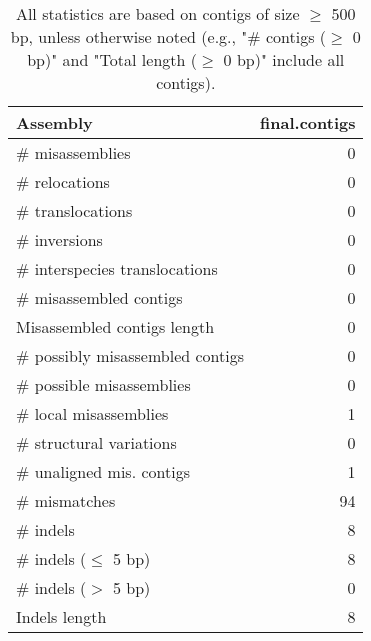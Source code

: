 \documentclass[12pt,a4paper]{article}
\begin{document}
\begin{table}[ht]
\begin{center}
\caption{All statistics are based on contigs of size $\geq$ 500 bp, unless otherwise noted (e.g., "\# contigs ($\geq$ 0 bp)" and "Total length ($\geq$ 0 bp)" include all contigs).}
\begin{tabular}{|l*{1}{|r}|}
\hline
Assembly & final.contigs \\ \hline
\# misassemblies & 0 \\ \hline
\hspace{5mm}\# relocations & 0 \\ \hline
\hspace{5mm}\# translocations & 0 \\ \hline
\hspace{5mm}\# inversions & 0 \\ \hline
\hspace{5mm}\# interspecies translocations & 0 \\ \hline
\# misassembled contigs & 0 \\ \hline
Misassembled contigs length & 0 \\ \hline
\# possibly misassembled contigs & 0 \\ \hline
\hspace{5mm}\# possible misassemblies & 0 \\ \hline
\# local misassemblies & 1 \\ \hline
\# structural variations & 0 \\ \hline
\# unaligned mis. contigs & 1 \\ \hline
\# mismatches & 94 \\ \hline
\# indels & 8 \\ \hline
\hspace{5mm}\# indels ($\leq$ 5 bp) & 8 \\ \hline
\hspace{5mm}\# indels ($>$ 5 bp) & 0 \\ \hline
Indels length & 8 \\ \hline
\end{tabular}
\end{center}
\end{table}
\end{document}
